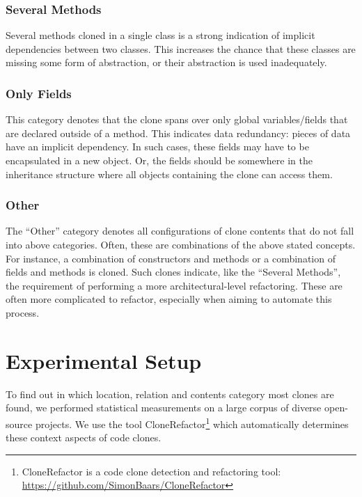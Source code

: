 \documentclass[runningheads]{llncs}
\begin{document}
\subsubsection{Several Methods}
Several methods cloned in a single class is a strong indication of implicit dependencies between two classes. This increases the chance that these classes are missing some form of abstraction, or their abstraction is used inadequately. %

\subsubsection{Only Fields}
This category denotes that the clone spans over only global variables/fields that are declared outside of a method. This indicates data redundancy: pieces of data have an implicit dependency. In such cases, these fields may have to be encapsulated in a new object. Or, the fields should be somewhere in the inheritance structure where all objects containing the clone can access them. %

\subsubsection{Other}
The ``Other'' category denotes all configurations of clone contents that do not fall into above categories. Often, these are combinations of the above stated concepts. For instance, a combination of constructors and methods or a combination of fields and methods is cloned. Such clones indicate, like the ``Several Methods'', the requirement of performing a more architectural-level refactoring. These are often more complicated to refactor, especially when aiming to automate this process.

\section{Experimental Setup}
To find out in which location, relation and contents category most clones are found, we performed statistical measurements on a large corpus of diverse open-source projects. We use the tool CloneRefactor\footnote{CloneRefactor is a code clone detection and refactoring tool: \url{https://github.com/SimonBaars/CloneRefactor}} which automatically determines these context aspects of code clones.
\end{document}
